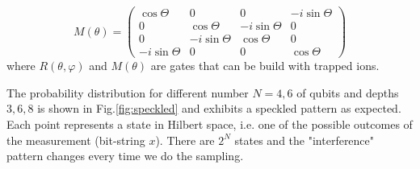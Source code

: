 \documentclass{article}
\begin{document}
\begin{equation}
M(\theta)=
\begin{pmatrix}
\cos\Theta & 0& 0& -i\sin\Theta \\
0&\cos\Theta & -i\sin\Theta& 0\\
0 & -i\sin\Theta & \cos\Theta &0 \\
-i\sin\Theta & 0 & 0&\cos\Theta
\end{pmatrix}
\end{equation}
where $R(\theta,\varphi)$ and $M(\theta)$ are gates that can be build with trapped ions.

The probability distribution for different number $N=4,6$ of qubits and depths $3,6,8$ is shown in Fig.\ref{fig:speckled} and exhibits a speckled pattern as expected. Each point represents a  state in Hilbert space,  i.e. one of the possible outcomes of the measurement (bit-string $x$). There are $2^N$ states and the "interference" pattern changes every time we do the sampling.
\end{document}
